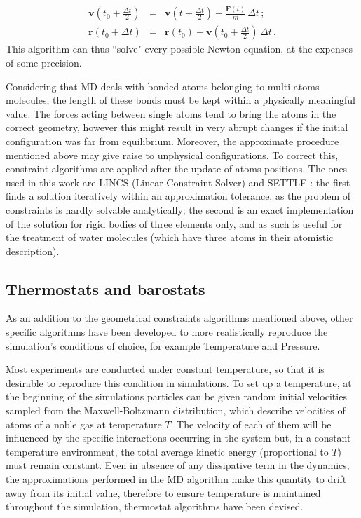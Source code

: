 \begin{eqnarray}
\mathbf{v}\left(t_0 + \frac{\Delta t}{2}\right) &=& \mathbf{v}\left(t - \frac{\Delta t}{2}\right) + \frac{\mathbf{F}(t)}{m} \, \Delta t \, ; \\
\mathbf{r}(t_0 + \Delta t) &=& \mathbf{r}(t_0) + \mathbf{v}\left(t_0 + \frac{\Delta t}{2}\right) \, \Delta t \, .
\end{eqnarray}
This algorithm can thus ``solve" every possible Newton equation, at the expenses of some precision.

Considering that MD deals with bonded atoms belonging to multi-atoms molecules, the length of these bonds must be kept within a physically meaningful value. The forces acting between single atoms tend to bring the atoms in the correct geometry, however this might result in very abrupt changes if the initial configuration was far from equilibrium. Moreover, the approximate procedure mentioned above may give raise to unphysical configurations. To correct this, constraint algorithms are applied after the update of atoms positions. The ones used in this work are LINCS (Linear Constraint Solver) \cite{Hess1997} and SETTLE \cite{Miyamoto1992}: the first finds a solution iteratively within an approximation tolerance, as the problem of constraints is hardly solvable analytically; the second is an exact implementation of the solution for rigid bodies of three elements only, and as such is useful for the treatment of water molecules (which have three atoms in their atomistic description).

\subsection{Thermostats and barostats}
As an addition to the geometrical constraints algorithms mentioned above, other specific algorithms have been developed to more realistically reproduce the simulation's conditions of choice, for example Temperature and Pressure.

Most experiments are conducted under constant temperature, so that it is desirable to reproduce this condition in simulations.
%
To set up a temperature, at the beginning of the simulations particles can be given random initial velocities sampled from the Maxwell-Boltzmann distribution, which describe velocities of atoms of a noble gas at temperature $T$. The velocity of each of them will be influenced by the specific interactions occurring in the system but, in a constant temperature environment, the total average kinetic energy (proportional to $T$) must remain constant.
%
Even in absence of any dissipative term in the dynamics, the approximations performed in the MD algorithm make this quantity to drift away from its initial value, therefore to ensure temperature is maintained throughout the simulation, thermostat algorithms have been devised.

